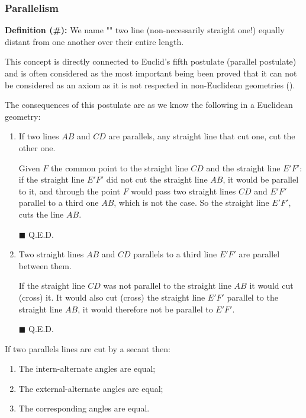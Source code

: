 	\pagebreak
	\subsubsection{Parallelism}
	\textbf{Definition (\#\mydef):} We name "" two line (non-necessarily straight one!) equally distant from one another over their entire length.

	This concept is directly connected to Euclid's fifth postulate (parallel postulate) and is often considered as the most important being been proved that it can not be considered as an axiom as it is not respected in non-Euclidean geometries ().
	
	The consequences of this postulate 	are as we know the following in a Euclidean geometry:
	\begin{enumerate}
		\item If two lines $AB$ and $CD$ are parallels, any straight line that cut one, cut the other one.
		\begin{dem}
		Given $F$ the common point to the straight line $CD$ and the straight line $E'F'$: if the straight line $E'F'$ did not cut the straight line $AB$, it would be parallel to it, and through the point $F$ would pass two straight lines $CD$ and $E'F'$ parallel to a third one $AB$, which is not the case. So the straight line $E'F'$, cuts the line $AB$.
		\begin{flushright}
			$\blacksquare$  Q.E.D.
		\end{flushright}
		\end{dem}

		\item Two straight lines $AB$ and $CD$ parallels to a third line $E'F'$ are parallel between them.
		\begin{dem}
		If the straight line $CD$ was not parallel to the straight line $AB$ it would cut (cross) it. It would also cut (cross) the straight line $E'F '$ parallel to the straight line $AB$, it would therefore not be parallel to $E 'F'$.
		\begin{flushright}
			$\blacksquare$  Q.E.D.
		\end{flushright}
		\end{dem}
	\end{enumerate}
	\begin{theorem}
	If two parallels lines are cut by a secant then:
	\begin{enumerate}
		\item The intern-alternate angles are equal;
		\item The external-alternate angles are equal;
		\item The corresponding angles are equal.
	\end{enumerate}
	\end{theorem}
